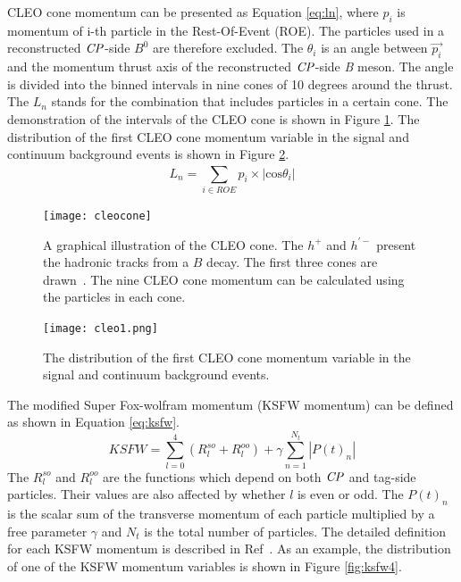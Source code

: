 CLEO cone momentum can be presented as Equation \ref{eq:ln}, where $ p_i $ is momentum of i-th particle in the Rest-Of-Event (ROE). The particles used in a reconstructed $\it{CP}$-side $B^0$ are therefore excluded. The $\theta_i$ is an angle between $\vec{p_i}$ and the momentum thrust axis of the reconstructed $\it{CP}$-side \textit{B} meson. The angle is divided into the binned intervals in nine cones of 10 degrees around the thrust.  The $L_n$ stands for the combination that includes particles in a certain cone. The demonstration of the intervals of the CLEO cone is shown in Figure \ref{fig:cleocone}. The distribution of the first CLEO cone momentum variable in the signal and continuum background events is shown in Figure \ref{fig:cleo1}.
\begin{equation}\label{eq:ln}
L_n = \sum_{i\in ROE}^{} p_i \times |\text{cos}\theta_i|
\end{equation}

\begin{figure}[htpb]
\centering
\texttt{[image: cleocone]}
\caption{A graphical illustration of the CLEO cone. The $h^+$ and $h^{'-}$ present the hadronic tracks from a $B$ decay. The first three cones are drawn~\cite{Bevan_2014}. The nine CLEO cone momentum can be calculated using the particles in each cone. }
\label{fig:cleocone}
\end{figure}
\begin{figure}[htpb]
	\centering
	\texttt{[image: cleo1.png]}
	\caption{The distribution of the first CLEO cone momentum variable in the signal and continuum background events.}
	\label{fig:cleo1}
\end{figure}

The modified Super Fox-wolfram momentum (KSFW momentum) can be defined as shown in Equation \ref{eq:ksfw}.
\begin{equation}\label{eq:ksfw}
KSFW = \sum_{l=0}^{4}( R_l^{so} + R_l^{oo}) + \gamma \sum_{n=1}^{N_t}|P(t)_n|
\end{equation} 
The $R_l^{so}$ and $R_l^{oo}$ are the functions which depend on both $\it{CP}$ and tag-side particles. Their values are also affected by whether $l$ is even or odd. The $P(t)_n$ is the scalar sum of the transverse momentum of
each particle multiplied by a free parameter $\gamma$ and $N_t$ is
the total number of particles. The detailed  definition for each KSFW momentum is described in Ref~\cite{bevan2017physics}. As an example, the distribution of one of the KSFW momentum variables is shown in Figure \ref{fig:ksfw4}.

